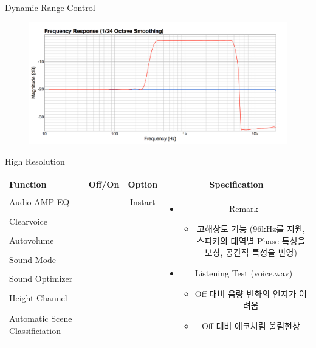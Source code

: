 \documentclass{beamer}
\begin{document}
\begin{frame}[t]{Dynamic Range Control}
		\begin{figure}[b]
			\includegraphics[height=0.32\textwidth]{figure/drc.png}
		\end{figure}
		
	\end{frame}
	
	
	\begin{frame}[t]{High Resolution}
		\begin{tiny}
			\begin{tabular}{@{}lccc@{}}
				\toprule
				Function & Off/On & Option & Specification \\
				\midrule
				Audio AMP EQ & \color{black}{Off} & Instart &
				\multirow{14}{60mm}{
					\begin{itemize}
						\item Remark
						\begin{itemize}
							\item 고해상도 기능 (96kHz를 지원, 스피커의 대역별 Phase 특성을 보상, 공간적 특성을 반영)
						\end{itemize}
						\item Listening Test (voice.wav)
						\begin{itemize}
							\item Off 대비 음량 변화의 인지가 어려움
							\item Off 대비 에코처럼 울림현상
						\end{itemize}
					\end{itemize}
				} \\
				Clearvoice & \color{black}{Off} & & \\
				Autovolume & \color{black}{Off} & & \\
				Sound Mode & \color{black}{Off} & & \\
				Sound Optimizer & \color{black}{Off} & & \\
				Height Channel & \color{black}{Off} & & \\
				Automatic Scene Classificiation & \color{black}{Off} & & \\

\end{tabular}
\end{tiny}
\end{frame}
\end{document}

